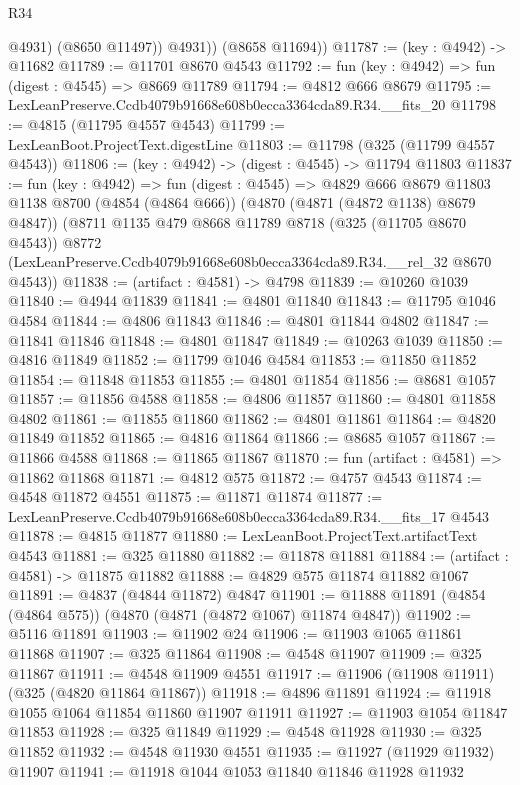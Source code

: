 \begin{lexlean}{R34}
\begin{coremodule}
              @4931)
            (@8650 @11497))
          @4931))
      (@8658 @11694))
@11787 := (key : @4942) -> @11682
@11789 := @11701 @8670 @4543
@11792 := fun (key : @4942) => fun (digest : @4545) => @8669 @11789
@11794 := @4812 @666 @8679
@11795 := LexLeanPreserve.Ccdb4079b91668e608b0ecca3364cda89.R34.__fits_20
@11798 := @4815 (@11795 @4557 @4543)
@11799 := LexLeanBoot.ProjectText.digestLine
@11803 := @11798 (@325 (@11799 @4557 @4543))
@11806 := (key : @4942) -> (digest : @4545) -> @11794 @11803
@11837 := fun (key : @4942) =>
  fun (digest : @4545) =>
  @4829
    @666
    @8679
    @11803
    @1138
    @8700
    (@4854 (@4864 @666))
    (@4870 (@4871 (@4872 @1138) @8679 @4847))
    (@8711
      @1135
      @479
      @8668
      @11789
      @8718
      (@325 (@11705 @8670 @4543))
      @8772
      (LexLeanPreserve.Ccdb4079b91668e608b0ecca3364cda89.R34.__rel_32 @8670 @4543))
@11838 := (artifact : @4581) -> @4798
@11839 := @10260 @1039
@11840 := @4944 @11839
@11841 := @4801 @11840
@11843 := @11795 @1046 @4584
@11844 := @4806 @11843
@11846 := @4801 @11844 @4802
@11847 := @11841 @11846
@11848 := @4801 @11847
@11849 := @10263 @1039
@11850 := @4816 @11849
@11852 := @11799 @1046 @4584
@11853 := @11850 @11852
@11854 := @11848 @11853
@11855 := @4801 @11854
@11856 := @8681 @1057
@11857 := @11856 @4588
@11858 := @4806 @11857
@11860 := @4801 @11858 @4802
@11861 := @11855 @11860
@11862 := @4801 @11861
@11864 := @4820 @11849 @11852
@11865 := @4816 @11864
@11866 := @8685 @1057
@11867 := @11866 @4588
@11868 := @11865 @11867
@11870 := fun (artifact : @4581) => @11862 @11868
@11871 := @4812 @575
@11872 := @4757 @4543
@11874 := @4548 @11872 @4551
@11875 := @11871 @11874
@11877 := LexLeanPreserve.Ccdb4079b91668e608b0ecca3364cda89.R34.__fits_17 @4543
@11878 := @4815 @11877
@11880 := LexLeanBoot.ProjectText.artifactText @4543
@11881 := @325 @11880
@11882 := @11878 @11881
@11884 := (artifact : @4581) -> @11875 @11882
@11888 := @4829 @575 @11874 @11882 @1067
@11891 := @4837 (@4844 @11872) @4847
@11901 := @11888 @11891 (@4854 (@4864 @575)) (@4870 (@4871 (@4872 @1067) @11874 @4847))
@11902 := @5116 @11891
@11903 := @11902 @24
@11906 := @11903 @1065 @11861 @11868
@11907 := @325 @11864
@11908 := @4548 @11907
@11909 := @325 @11867
@11911 := @4548 @11909 @4551
@11917 := @11906 (@11908 @11911) (@325 (@4820 @11864 @11867))
@11918 := @4896 @11891
@11924 := @11918 @1055 @1064 @11854 @11860 @11907 @11911
@11927 := @11903 @1054 @11847 @11853
@11928 := @325 @11849
@11929 := @4548 @11928
@11930 := @325 @11852
@11932 := @4548 @11930 @4551
@11935 := @11927 (@11929 @11932) @11907
@11941 := @11918 @1044 @1053 @11840 @11846 @11928 @11932

\end{coremodule}
\end{lexlean}

